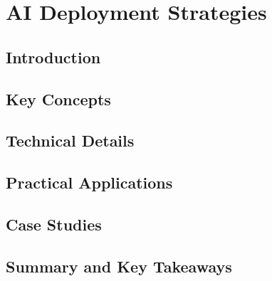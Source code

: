 ﻿%

\chapter{AI Deployment Strategies}
\label{ch:chapter-11}

\section{Introduction}


\section{Key Concepts}


\section{Technical Details}


\section{Practical Applications}


\section{Case Studies}


\section{Summary and Key Takeaways}


